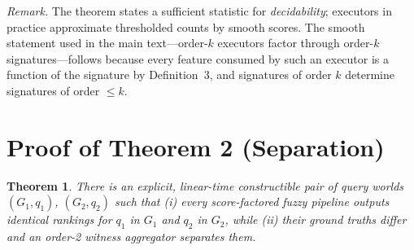 \documentclass[journal]{IEEEtran}
\newtheorem{theorem*}{Theorem}
\begin{document}
\emph{Remark.} The theorem states a sufficient statistic for
\emph{decidability}; executors in practice approximate thresholded counts
by smooth scores. The smooth statement used in the main text---order-$k$
executors factor through order-$k$ signatures---follows because every
feature consumed by such an executor is a function of the signature by
Definition~3, and signatures of order $k$ determine signatures of order
$\le k$.

\section{Proof of Theorem 2 (Separation)}

\begin{theorem*}
There is an explicit, linear-time constructible pair of query worlds
$(G_1,q_1)$, $(G_2,q_2)$ such that (i) every score-factored fuzzy pipeline
outputs identical rankings for $q_1$ in $G_1$ and $q_2$ in $G_2$, while
(ii) their ground truths differ and an order-2 witness aggregator
separates them.
\end{theorem*}
\end{document}
